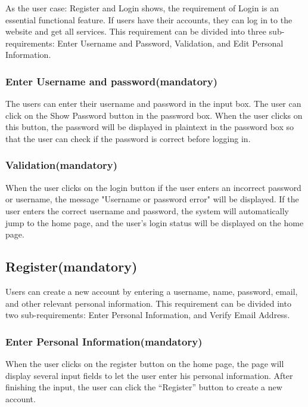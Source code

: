 \documentclass[conference]{IEEEtran}
\begin{document}
As the user case: Register and Login shows, the requirement of Login is an essential functional feature. If users have their accounts, they can log in to the website and get all services. This requirement can be divided into three sub-requirements: 
Enter Username and Password, Validation, and Edit Personal Information.

\subsubsection{ Enter Username and password(mandatory)}

The users can enter their username and password in the input box. The 
user can click on the Show Password button in the password box. When the user 
clicks on this button, the password will be displayed in plaintext in the password 
box so that the user can check if the password is correct before logging in.

\subsubsection{ Validation(mandatory) }

When the user clicks on the login button if the user enters an incorrect 
password or username, the message "Username or password error" will be 
displayed. If the user enters the correct username and password, the system 
will automatically jump to the home page, and the user's login status will be 
displayed on the home page.


\subsection{  Register(mandatory)}

Users can create a new account by entering a username, name, password, email,
and other relevant personal information. This requirement can be divided into 
two sub-requirements: Enter Personal Information, and Verify Email Address.

\subsubsection{ Enter Personal Information(mandatory)}

When the user clicks on the register button on the home page, the page will display several 
input fields to let the user enter his personal information. After finishing the 
input, the user can click the “Register” button to create a new account.
\end{document}
